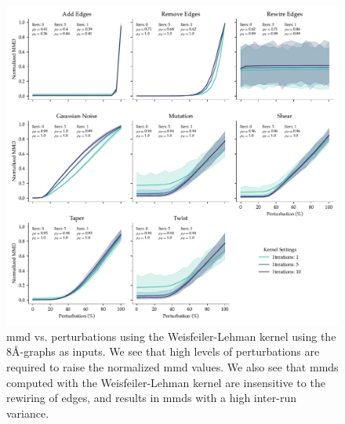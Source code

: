 
\begin{figure}
  \includegraphics[width=\textwidth]{./figures/results/res_3.pdf}
  \caption[Normalized \acrshort{mmd} values using the Weisfeiler-Lehman kernel subject to
  various perturbations.]{\acrshort{mmd} vs.
perturbations using the Weisfeiler-Lehman kernel using the
8\si{\angstrom}-graphs as inputs. We see that high levels of perturbations are
required to raise the normalized \acrshort{mmd} values. We also see that \acrshort{mmd}s computed with
the Weisfeiler-Lehman kernel are insensitive to the rewiring of edges, and
results in \acrshort{mmd}s with a high inter-run variance.}
  \label{fig:wlk}
\end{figure}


